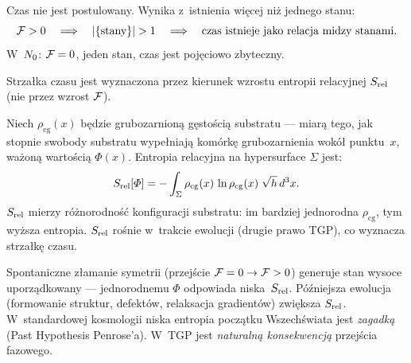 \begin{proposition}\label{prop:czas}
Czas nie jest postulowany. Wynika z~istnienia wi\k{e}cej ni\.z jednego
stanu:
\begin{equation}
    \Ffield > 0
    \quad\Longrightarrow\quad
    |\{\text{stany}\}| > 1
    \quad\Longrightarrow\quad
    \text{czas istnieje jako relacja mi\k{e}dzy stanami.}
\end{equation}
W~$N_0$: $\mathcal{F} = 0$, jeden stan, czas jest poj\k{e}ciowo
zbyteczny.
\end{proposition}

Strza\l{}ka czasu jest wyznaczona przez kierunek wzrostu
entropii relacyjnej $S_{\mathrm{rel}}$ (nie przez wzrost $\mathcal{F}$).

\begin{definition}\label{def:Srel}
Niech $\rho_{\mathrm{cg}}(x)$ b\k{e}dzie grubozarnion\k{a}
g\k{e}sto\'sci\k{a} substratu --- miar\k{a} tego, jak
stopnie swobody substratu wype\l{}niaj\k{a} kom\'ork\k{e}
grubozarnienia wok\'o\l{} punktu~$x$, wa\.zon\k{a}
warto\'sci\k{a} $\Phi(x)$. Entropia relacyjna na hypersurface
$\Sigma$ jest:
\begin{equation}\label{eq:Srel}
    S_{\mathrm{rel}}[\varPhi] = -\int_\Sigma \rho_{\mathrm{cg}}(x)\,
    \ln\rho_{\mathrm{cg}}(x)\;\sqrt{h}\,d^3x.
\end{equation}
$S_{\mathrm{rel}}$ mierzy r\'o\.znorodno\'s\'c konfiguracji substratu:
im bardziej jednorodna $\rho_{\mathrm{cg}}$, tym wy\.zsza
entropia. $S_{\mathrm{rel}}$ ro\'snie w~trakcie ewolucji (drugie prawo TGP),
co wyznacza strza\l{}k\k{e} czasu.
\end{definition}

\begin{remark}
Spontaniczne z\l{}amanie symetrii (przej\'scie
$\mathcal{F} = 0 \to \mathcal{F} > 0$) generuje stan wysoce
uporz\k{a}dkowany --- jednorodnemu $\Phi$ odpowiada
niska~$S_{\mathrm{rel}}$. P\'o\'zniejsza ewolucja (formowanie struktur,
defekt\'ow, relaksacja gradient\'ow) zwi\k{e}ksza $S_{\mathrm{rel}}$.
W~standardowej kosmologii niska entropia pocz\k{a}tku Wszech\'swiata
jest \emph{zagadk\k{a}} (Past Hypothesis Penrose'a).
W~TGP jest \emph{naturaln\k{a} konsekwencj\k{a}} przej\'scia
fazowego.
\end{remark}

